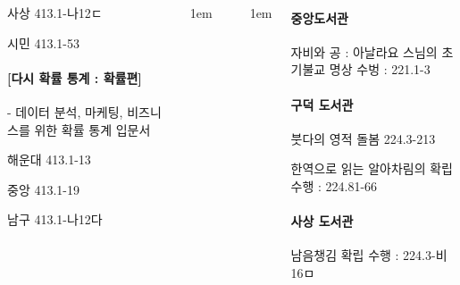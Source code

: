\documentclass[	20pt, 
							a1paper, 
							portrait, %
							margin=0mm, %
							innermargin=10mm,  		%
							colspace=5mm, 
							subcolspace=0mm
							]{tikzposter}
\begin{document}
\begin{columns}
{\begin{LARGE}
사상    413.1-나12ㄷ

시민   413.1-53


\paragraph{[다시 확률 통계 : 확률편]}
 - 데이터 분석, 마케팅, 비즈니스를 위한 확률 통계 입문서

해운대  413.1-13

중앙   413.1-19

남구  413.1-나12다  


				\end{LARGE}
			} %




			{
					\setlength{\leftmargini}{4em}
					\setlength{\labelsep} {1em}
				\begin{LARGE}



				\end{LARGE}
			} %

			{
					\setlength{\leftmargini}{4em}
					\setlength{\labelsep} {1em}
				\begin{LARGE}

		\paragraph{중앙도서관}

		자비와 공 : 아날라요 스님의 초기불교 명상 수벙 : 221.1-3

		\paragraph{		구덕 도서관}

		붓다의 영적 돌봄 224.3-213

		한역으로 읽는 알아차림의 확립 수행 : 224.81-66

		\paragraph{사상 도서관}

		남음챙김 확립 수행 : 224.3-비16ㅁ


\end{LARGE}}
\end{columns}
\end{document}
